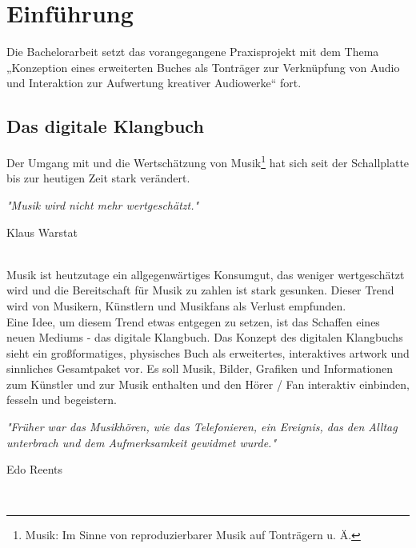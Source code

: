 

\chapter{Einführung}\label{einleitung}

Die Bachelorarbeit setzt das vorangegangene Praxisprojekt mit dem Thema „Konzeption eines erweiterten Buches als Tonträger zur Verknüpfung von Audio und Interaktion zur Aufwertung kreativer Audiowerke“ fort.

\section{Das digitale Klangbuch}
Der Umgang mit und die Wertschätzung von Musik\footnote{Musik: Im Sinne von reproduzierbarer Musik auf Tonträgern u. Ä.} hat sich seit der Schallplatte bis zur heutigen Zeit stark verändert.\\

{\centering\textcolor{m_pink}{\textit{"Musik wird nicht mehr wertgeschätzt."}}\\\hfill\begin{tiny}{Klaus Warstat \cite{K01}}\end{tiny}}\\

Musik ist heutzutage ein allgegenwärtiges Konsumgut, das weniger wertgeschätzt wird und die Bereitschaft für Musik zu zahlen ist stark gesunken.\cite{Spotify} Dieser Trend wird von Musikern, Künstlern und Musikfans als Verlust empfunden.\cite{K01}\cite{Lost}\\


Eine Idee, um diesem Trend etwas entgegen zu setzen, ist das Schaffen eines neuen Mediums - das digitale Klangbuch. Das Konzept des digitalen Klangbuchs sieht ein großformatiges, physisches Buch als erweitertes, interaktives \gls{artwork} und sinnliches Gesamtpaket vor. Es soll Musik, Bilder, Grafiken und Informationen zum Künstler und zur Musik enthalten und den Hörer / Fan interaktiv einbinden, fesseln und begeistern.\\ 

{\centering\textcolor{m_pink}{\textit{"Früher war das Musikhören, wie das Telefonieren, ein Ereignis, das den Alltag unterbrach und dem Aufmerksamkeit gewidmet wurde."}}\\\hfill\begin{tiny}{Edo Reents \cite{FAZ1}}\end{tiny}}\\


